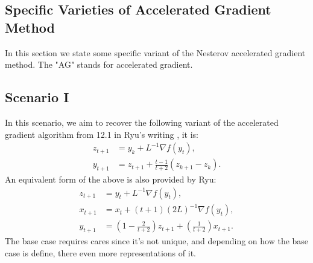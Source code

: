 \documentclass[12pt]{article}
\begin{document}
    \subsection{Specific Varieties of Accelerated Gradient Method}
        In this section we state some specific variant of the Nesterov accelerated gradient method. 
        The "AG" stands for accelerated gradient. 

    \subsection{Scenario I}
        In this scenario, we aim to recover the following variant of the accelerated gradient algorithm from 12.1 in Ryu's writing \cite{ryu_large-scale_2022}, it is: 
        \begin{align*}
            z_{t + 1} &= y_k + L^{-1}\nabla f(y_t), 
            \\
            y_{t + 1} &= z_{t + 1} + \frac{t - 1}{t + 2}\left(
                z_{k + 1} - z_k
            \right). 
        \end{align*}
        An equivalent form of the above is also provided by Ryu: 
        \begin{align*}
            z_{t + 1} &= y_t + L^{-1}\nabla f(y_t), 
            \\
            x_{t + 1} &= x_t + (t + 1)(2L)^{-1}\nabla f(y_t), 
            \\
            y_{t + 1} &= \left(
                1 - \frac{2}{t + 2} 
            \right)z_{t + 1} + 
            \left(
                \frac{1}{t + 2}
            \right)x_{t + 1}. 
        \end{align*}
        The base case requires cares since it's not unique, and depending on how the base case is define, there even more representations of it. 
\end{document}

